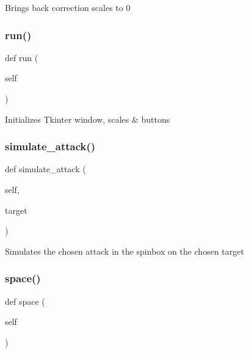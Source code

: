\begin{DoxyVerb}Brings back correction scales to 0\end{DoxyVerb}
 \mbox{\label{class_menu_1_1_menu_ad22709b2e67308af35f55680d5a026e0}} 
\subsubsection{\texorpdfstring{run()}{run()}}
{\footnotesize\ttfamily def run (\begin{DoxyParamCaption}\item[{}]{self }\end{DoxyParamCaption})}

\begin{DoxyVerb}Initializes Tkinter window, scales & buttons\end{DoxyVerb}
 \mbox{\label{class_menu_1_1_menu_a11923ed3ba9281c75035cbebc022fbf2}} 
\subsubsection{\texorpdfstring{simulate\+\_\+attack()}{simulate\_attack()}}
{\footnotesize\ttfamily def simulate\+\_\+attack (\begin{DoxyParamCaption}\item[{}]{self,  }\item[{}]{target }\end{DoxyParamCaption})}

\begin{DoxyVerb}Simulates the chosen attack in the spinbox on the chosen target\end{DoxyVerb}
 \mbox{\label{class_menu_1_1_menu_a116637ec8c851d32fde26d0155337cbe}} 
\subsubsection{\texorpdfstring{space()}{space()}}
{\footnotesize\ttfamily def space (\begin{DoxyParamCaption}\item[{}]{self }\end{DoxyParamCaption})}

